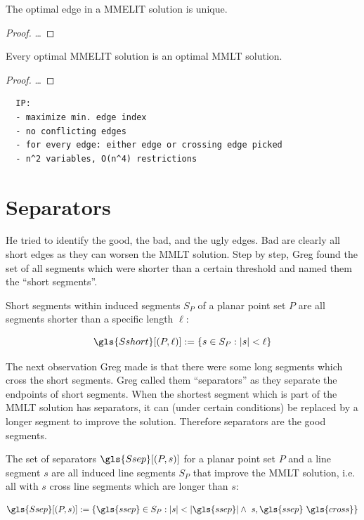 \begin{theorem}
  The optimal edge in a \gls{MMELIT} solution is unique.
\end{theorem}

\begin{proof}
  \ldots{}
\end{proof}

\begin{theorem}
  Every optimal \gls{MMELIT} solution is an optimal \gls{MMLT} solution.
\end{theorem}

\begin{proof}
  \ldots{}
\end{proof}

\begin{verbatim}
  IP:
  - maximize min. edge index
  - no conflicting edges
  - for every edge: either edge or crossing edge picked
  - n^2 variables, O(n^4) restrictions
\end{verbatim}

\section{Separators}
He tried to identify the good, the bad, and the ugly edges. Bad are
clearly all short edges as they can worsen the \gls{MMLT} solution.
Step by step, Greg found the set of all segments which were
shorter than a certain threshold and named them the
``short segments''.

\begin{definition}\label{def:short_segments}
  Short segments within induced segments \(S_P\) of a planar 
  point set \(P\) are all segments shorter than a specific length
  \(\ell\):

  \[
    \gls{Sshort}[(P, \ell)] := \{ s \in S_P : |s| < \ell \}
  \]
\end{definition}

The next observation Greg made is that there were some long segments
which cross the short segments. Greg called them ``separators'' as
they separate the endpoints of short segments. When the shortest
segment which is part of the \gls{MMLT} solution has separators, it
can (under certain conditions) be replaced by a longer segment to
improve the solution. Therefore separators are the good segments.

\begin{definition}[Separators]\label{def:separators}
  The set of separators \(\gls{Ssep}[(P, s)]\) for a planar point set
  \(P\) and a line segment
  \(s\) are all induced line segments \(S_P\) that improve the
  \gls{MMLT} solution, i.e. all with \(s\) \gls{cross} line segments
  which are longer than \(s\):

  \[
	  \gls{Ssep}[(P,s)] := \{
		  \gls{ssep} \in S_P :
		  |s| < |\gls{ssep}|\land~ s,\gls{ssep}~\gls{cross}
	  \}
  \]
\end{definition}

